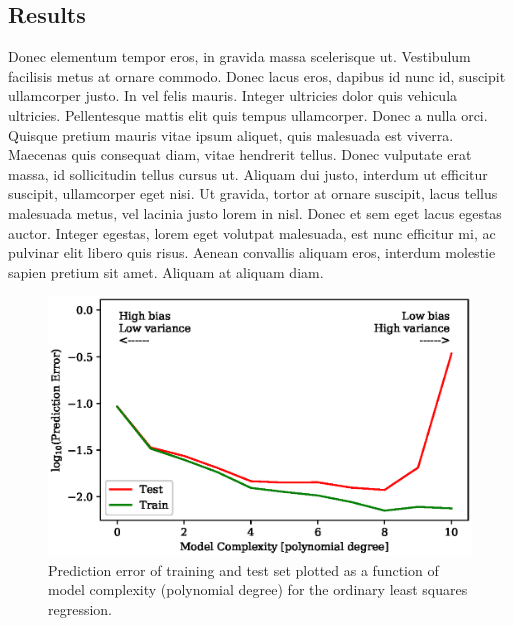 \documentclass[a4paper, 10pt]{article}
\begin{document}
\begin{multicols}{2}
\section{Results}
Donec elementum tempor eros, in gravida massa scelerisque ut. Vestibulum facilisis metus at ornare commodo. Donec lacus eros, dapibus id nunc id, suscipit ullamcorper justo. In vel felis mauris. Integer ultricies dolor quis vehicula ultricies. Pellentesque mattis elit quis tempus ullamcorper. Donec a nulla orci. Quisque pretium mauris vitae ipsum aliquet, quis malesuada est viverra. Maecenas quis consequat diam, vitae hendrerit tellus. Donec vulputate erat massa, id sollicitudin tellus cursus ut. Aliquam dui justo, interdum ut efficitur suscipit, ullamcorper eget nisi. Ut gravida, tortor at ornare suscipit, lacus tellus malesuada metus, vel lacinia justo lorem in nisl. Donec et sem eget lacus egestas auctor. Integer egestas, lorem eget volutpat malesuada, est nunc efficitur mi, ac pulvinar elit libero quis risus. Aenean convallis aliquam eros, interdum molestie sapien pretium sit amet. Aliquam at aliquam diam.


\end{multicols}

\begin{figure}[H]
    \includegraphics[scale=1]{figs/biasvariancetradeoff_ols_Franke.eps}
    \caption{Prediction error of training and test set plotted as a function of model complexity (polynomial degree) for the ordinary least squares regression.}
    \label{fig:my_label}
\end{figure}
    
\end{document}
